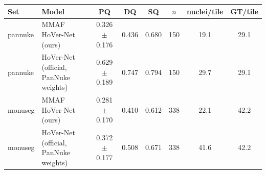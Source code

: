 \begin{tabular}{@{}llcccccc@{}}
\toprule
Set & Model & PQ & DQ & SQ & $n$ & nuclei/tile & GT/tile \\
\midrule
pannuke & MMAF HoVer-Net (ours) & 0.326$\pm$0.176 & 0.436 & 0.680 & 150 & 19.1 & 29.1 \\
pannuke & HoVer-Net (official, PanNuke weights) & 0.629$\pm$0.189 & 0.747 & 0.794 & 150 & 29.7 & 29.1 \\
monuseg & MMAF HoVer-Net (ours) & 0.281$\pm$0.170 & 0.410 & 0.612 & 338 & 22.1 & 42.2 \\
monuseg & HoVer-Net (official, PanNuke weights) & 0.372$\pm$0.177 & 0.508 & 0.671 & 338 & 41.6 & 42.2 \\
\bottomrule
\end{tabular}